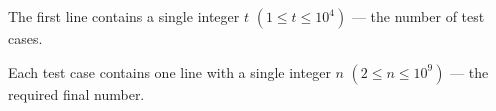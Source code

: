 The first line contains a single integer $t$ $(1≤t≤10^4)$ --- the number of test cases.

Each test case contains one line with a single integer $n$ $(2≤n≤10^9)$ --- the required final number.
